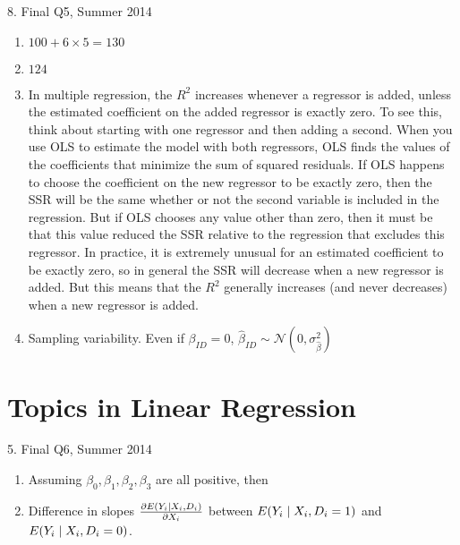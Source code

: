 \documentclass[12pt]{article}
\begin{document}
8. Final Q5, Summer 2014
\begin{enumerate}
  \item $100+6\times 5=130$
  
  \item $124$
  
  \item In multiple regression, the $R^2$ increases whenever a regressor is added, unless the estimated coefficient on the added regressor is exactly zero. To see this, think about starting with one regressor and then adding a second. When you use OLS to estimate the model with both regressors, OLS finds the values of the coefficients that minimize the sum of squared residuals. If OLS happens to choose the coefficient on the new regressor to be exactly zero, then the SSR will be the same whether or not the second variable is included in the regression. But if OLS chooses any value other than zero, then it must be that this value reduced the SSR relative to the regression that excludes this regressor. In practice, it is extremely unusual for an estimated coefficient to be exactly zero, so in general the SSR will decrease when a new regressor is added. But this means that the $R^2$ generally increases (and never decreases) when a new regressor is added.
  
  \item Sampling variability. Even if $\beta_{ID}=0$, $\hat\beta_{ID}\sim\mathcal N(0,\sigma_{\hat\beta}^2)$
\end{enumerate}



\section{Topics in Linear Regression}
5. Final Q6, Summer 2014
\begin{enumerate}
  \item Assuming $\beta_0,\beta_1,\beta_2,\beta_3$ are all positive, then
  \begin{center}
  \end{center}
  
  \item Difference in slopes $\frac{\partial E(Y_i\given X_i,D_i)}{\partial X_i}$ between $E(Y_i\given X_i,D_i=1)$ and $E(Y_i\given X_i,D_i=0)$.
\end{enumerate}
\end{document}
